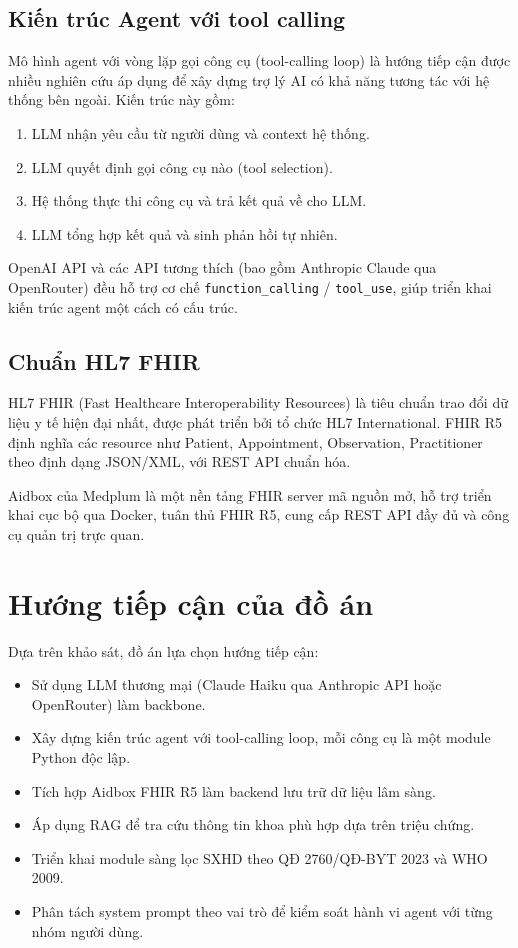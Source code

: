 \documentclass[oneside, a4paper]{book}
\theoremstyle{plain}
\theoremstyle{plain}
\theoremstyle{definition}
\theoremstyle{remark}
\begin{document}
\subsection{Kiến trúc Agent với tool calling}

Mô hình agent với vòng lặp gọi công cụ (tool-calling loop) là hướng tiếp cận được nhiều nghiên cứu áp dụng để xây dựng trợ lý AI có khả năng tương tác với hệ thống bên ngoài. Kiến trúc này gồm:

\begin{enumerate}
  \item LLM nhận yêu cầu từ người dùng và context hệ thống.
  \item LLM quyết định gọi công cụ nào (tool selection).
  \item Hệ thống thực thi công cụ và trả kết quả về cho LLM.
  \item LLM tổng hợp kết quả và sinh phản hồi tự nhiên.
\end{enumerate}

OpenAI API và các API tương thích (bao gồm Anthropic Claude qua OpenRouter) đều hỗ trợ cơ chế \texttt{function\_calling} / \texttt{tool\_use}, giúp triển khai kiến trúc agent một cách có cấu trúc.

\subsection{Chuẩn HL7 FHIR}

HL7 FHIR (Fast Healthcare Interoperability Resources) là tiêu chuẩn trao đổi dữ liệu y tế hiện đại nhất, được phát triển bởi tổ chức HL7 International. FHIR R5 định nghĩa các resource như Patient, Appointment, Observation, Practitioner theo định dạng JSON/XML, với REST API chuẩn hóa.

Aidbox của Medplum là một nền tảng FHIR server mã nguồn mở, hỗ trợ triển khai cục bộ qua Docker, tuân thủ FHIR R5, cung cấp REST API đầy đủ và công cụ quản trị trực quan.

\section{Hướng tiếp cận của đồ án}

Dựa trên khảo sát, đồ án lựa chọn hướng tiếp cận:
\begin{itemize}
  \item Sử dụng LLM thương mại (Claude Haiku qua Anthropic API hoặc OpenRouter) làm backbone.
  \item Xây dựng kiến trúc agent với tool-calling loop, mỗi công cụ là một module Python độc lập.
  \item Tích hợp Aidbox FHIR R5 làm backend lưu trữ dữ liệu lâm sàng.
  \item Áp dụng RAG để tra cứu thông tin khoa phù hợp dựa trên triệu chứng.
  \item Triển khai module sàng lọc SXHD theo QĐ 2760/QĐ-BYT 2023 và WHO 2009.
  \item Phân tách system prompt theo vai trò để kiểm soát hành vi agent với từng nhóm người dùng.
\end{itemize}
\end{document}
